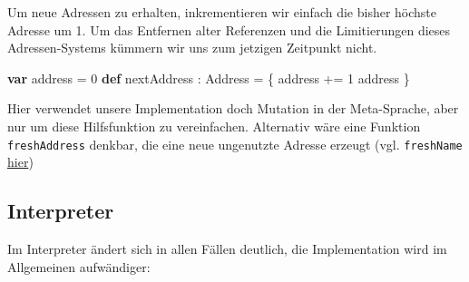\documentclass[]{article}
\newenvironment{Shaded}{}{}
\newcommand{\DecValTok}[1]{\textcolor[rgb]{0.25,0.63,0.44}{#1}}
\newcommand{\KeywordTok}[1]{\textcolor[rgb]{0.00,0.44,0.13}{\textbf{#1}}}
\newcommand{\NormalTok}[1]{#1}
\begin{document}
Um neue Adressen zu erhalten, inkrementieren wir einfach die bisher
höchste Adresse um 1. Um das Entfernen alter Referenzen und die
Limitierungen dieses Adressen-Systems kümmern wir uns zum jetzigen
Zeitpunkt nicht.

\begin{Shaded}
\begin{Highlighting}[]
\KeywordTok{var}\NormalTok{ address = }\DecValTok{0}
\KeywordTok{def}\NormalTok{ nextAddress : Address = \{}
\NormalTok{  address += }\DecValTok{1}
\NormalTok{  address}
\NormalTok{\}}
\end{Highlighting}
\end{Shaded}

Hier verwendet unsere Implementation doch Mutation in der Meta-Sprache,
aber nur um diese Hilfsfunktion zu vereinfachen. Alternativ wäre eine
Funktion \texttt{freshAddress} denkbar, die eine neue ungenutzte Adresse
erzeugt (vgl. \texttt{freshName}
\protect\hyperlink{capture-avoiding-substitution}{hier})

\hypertarget{interpreter}{%
\subsection{Interpreter}\label{interpreter}}

Im Interpreter ändert sich in allen Fällen deutlich, die Implementation
wird im Allgemeinen aufwändiger:
\end{document}
